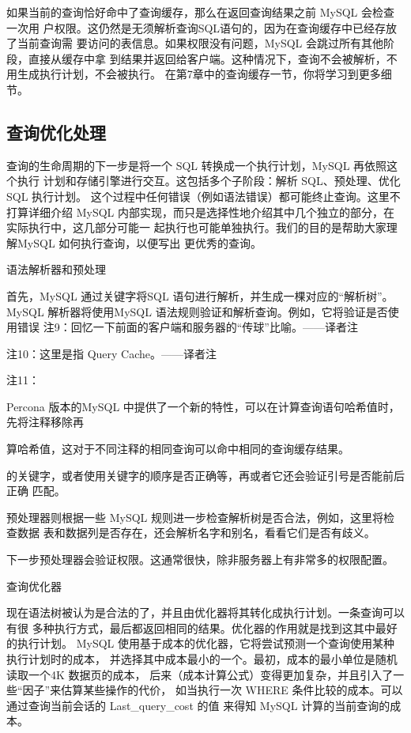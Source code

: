 如果当前的查询恰好命中了查询缓存，那么在返回查询结果之前 MySQL 会检查一次用
户权限。这仍然是无须解析查询SQL语句的，因为在查询缓存中已经存放了当前查询需
要访问的表信息。如果权限没有问题，MySQL 会跳过所有其他阶段，直接从缓存中拿
到结果并返回给客户端。这种情况下，查询不会被解析，不用生成执行计划，不会被执行。
在第7章中的查询缓存一节，你将学习到更多细节。

\subsection{查询优化处理}
查询的生命周期的下一步是将一个 SQL 转换成一个执行计划，MySQL 再依照这个执行
计划和存储引擎进行交互。这包括多个子阶段：解析 SQL、预处理、优化 SQL 执行计划。
这个过程中任何错误（例如语法错误）都可能终止查询。这里不打算详细介绍 MySQL
内部实现，而只是选择性地介绍其中几个独立的部分，在实际执行中，这几部分可能一
起执行也可能单独执行。我们的目的是帮助大家理解MySQL 如何执行查询，以便写出
更优秀的查询。

语法解析器和预处理

首先，MySQL 通过关键字将SQL 语句进行解析，并生成一棵对应的“解析树”。
MySQL 解析器将使用MySQL 语法规则验证和解析查询。例如，它将验证是否使用错误
注9：回忆一下前面的客户端和服务器的“传球”比喻。——译者注

注10：这里是指 Query Cache。——译者注

注11：

Percona 版本的MySQL 中提供了一个新的特性，可以在计算查询语句哈希值时，先将注释移除再

算哈希值，这对于不同注释的相同查询可以命中相同的查询缓存结果。

的关键字，或者使用关键字的顺序是否正确等，再或者它还会验证引号是否能前后正确
匹配。

预处理器则根据一些 MySQL 规则进一步检查解析树是否合法，例如，这里将检查数据
表和数据列是否存在，还会解析名字和别名，看看它们是否有歧义。

下一步预处理器会验证权限。这通常很快，除非服务器上有非常多的权限配置。

查询优化器

现在语法树被认为是合法的了，并且由优化器将其转化成执行计划。一条查询可以有很
多种执行方式，最后都返回相同的结果。优化器的作用就是找到这其中最好的执行计划。
MySQL 使用基于成本的优化器，它将尝试预测一个查询使用某种执行计划时的成本，
并选择其中成本最小的一个。最初，成本的最小单位是随机读取一个4K 数据页的成本，
后来（成本计算公式）变得更加复杂，并且引入了一些“因子”来估算某些操作的代价，
如当执行一次 WHERE 条件比较的成本。可以通过查询当前会话的 Last\_query\_cost 的值
来得知 MySQL 计算的当前查询的成本。

